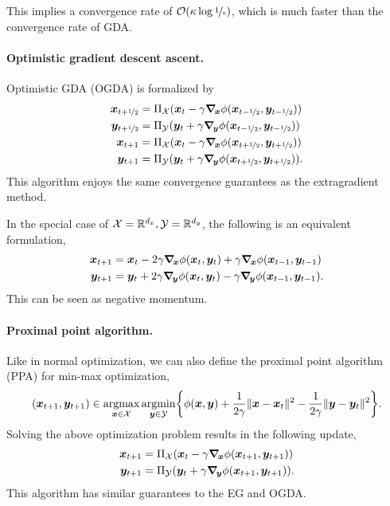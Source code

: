 This implies a convergence rate of $\bigo{\kappa \log \nicefrac{1}{\epsilon}}$, which is much
faster than the convergence rate of GDA.

\paragraph{Optimistic gradient descent ascent.}

Optimistic GDA (OGDA) is formalized by
\begin{align*}
    \vec{x}_{t+\nicefrac{1}{2}} & = \Pi_{\mathcal{X}}(\vec{x}_t - \gamma \grad{\phi(\vec{x}_{t-\nicefrac{1}{2}}, \vec{y}_{t-\nicefrac{1}{2}})}{\vec{x}})  \\
    \vec{y}_{t+\nicefrac{1}{2}} & = \Pi_{\mathcal{Y}}(\vec{y}_t + \gamma \grad{\phi(\vec{x}_{t-\nicefrac{1}{2}}, \vec{y}_{t-\nicefrac{1}{2}})}{\vec{y}})  \\
    \vec{x}_{t+1}               & = \Pi_{\mathcal{X}}(\vec{x}_t - \gamma \grad{\phi(\vec{x}_{t+\nicefrac{1}{2}}, \vec{y}_{t+\nicefrac{1}{2}})}{\vec{x}})  \\
    \vec{y}_{t+1}               & = \Pi_{\mathcal{Y}}(\vec{y}_t + \gamma \grad{\phi(\vec{x}_{t+\nicefrac{1}{2}}, \vec{y}_{t+\nicefrac{1}{2}})}{\vec{y}}).
\end{align*}
This algorithm enjoys the same convergence guarantees as the extragradient method.

In the special case of $\mathcal{X} = \R^{d_x}, \mathcal{Y} = \R^{d_y}$, the following is an
equivalent formulation,
\begin{align*}
    \vec{x}_{t+1} & = \vec{x}_t - 2 \gamma \grad{\phi(\vec{x}_t, \vec{y}_t)}{\vec{x}} + \gamma \grad{\phi(\vec{x}_{t-1}, \vec{y}_{t-1})}{\vec{x}}  \\
    \vec{y}_{t+1} & = \vec{y}_t + 2 \gamma \grad{\phi(\vec{x}_t, \vec{y}_t)}{\vec{y}} - \gamma \grad{\phi(\vec{x}_{t-1}, \vec{y}_{t-1})}{\vec{y}}.
\end{align*}
This can be seen as negative momentum.

\paragraph{Proximal point algorithm.}

Like in normal optimization, we can also define the proximal point algorithm (PPA) for min-max
optimization, \[
    (\vec{x}_{t+1}, \vec{y}_{t+1}) \in \argmax_{\vec{x} \in \mathcal{X}} \argmin_{\vec{y} \in \mathcal{Y}} \lft\{ \phi(\vec{x}, \vec{y}) + \frac{1}{2 \gamma} \| \vec{x} - \vec{x}_t \|^2 - \frac{1}{2 \gamma} \| \vec{y} - \vec{y}_t \|^2 \rgt\}.
\]
Solving the above optimization problem results in the following update,
\begin{align*}
    \vec{x}_{t+1} & = \Pi_{\mathcal{X}}(\vec{x}_t - \gamma \grad{\phi(\vec{x}_{t+1}, \vec{y}_{t+1})}{\vec{x}})  \\
    \vec{y}_{t+1} & = \Pi_{\mathcal{Y}}(\vec{y}_t + \gamma \grad{\phi(\vec{x}_{t+1}, \vec{y}_{t+1})}{\vec{y}}).
\end{align*}
This algorithm has similar guarantees to the EG and OGDA.
